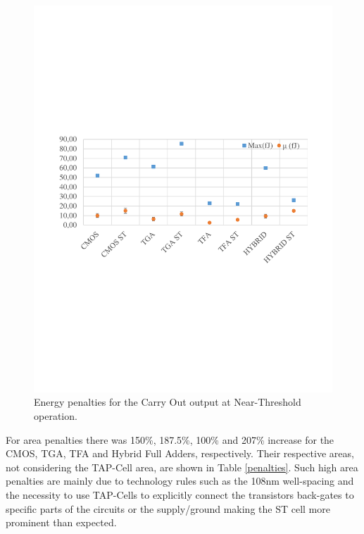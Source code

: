\documentclass[ecp,tc, english]{iiufrgs}
\begin{document}
\begin{figure}[H]
\centering
\includegraphics[width=\textwidth, trim={0 9cm 0 9cm},clip]{energyNTCarryOut.pdf}
\caption{Energy penalties for the Carry Out output at Near-Threshold operation.}
\label{fig:energyNTCO}
\end{figure}

For area penalties there was 150\%, 187.5\%, 100\% and 207\% increase for the CMOS, TGA, TFA and Hybrid Full Adders, respectively. Their respective areas, not considering the TAP-Cell area, are shown in Table \ref{penalties}. Such high area penalties are mainly due to technology rules such as the 108nm well-spacing and the necessity to use TAP-Cells to explicitly connect the transistors back-gates to specific parts of the circuits or the supply/ground making the ST cell more prominent than expected.
\end{document}
